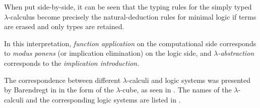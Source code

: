 When put side-by-side, it can be seen that the typing rules for the simply typed
$\lambda$-calculus become precisely the natural-deduction rules for minimal logic
if terms are erased and only types are retained.

In this interpretation, \emph{function application} on the computational side corresponds
to \emph{modus ponens} (or implication elimination) on the logic side, and
\emph{$\lambda$-abstraction} corresponds to the \emph{implication introduction}.

The correspondence between different $\lambda$-calculi and logic systems was presented
by Barendregt in \cite{barendregt91} in the form of the $\lambda$-cube, as seen in
. The names of the $\lambda$-calculi and the corresponding
logic systems are listed in .

